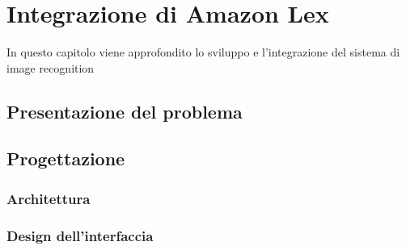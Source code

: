 
\chapter{Integrazione di Amazon Lex}
\label{cap:lex}

In questo capitolo viene approfondito lo sviluppo e l'integrazione del sistema di image recognition \\


\section{Presentazione del problema}
\section{Progettazione}
	\subsection{Architettura}
	\subsection{Design dell'interfaccia}

